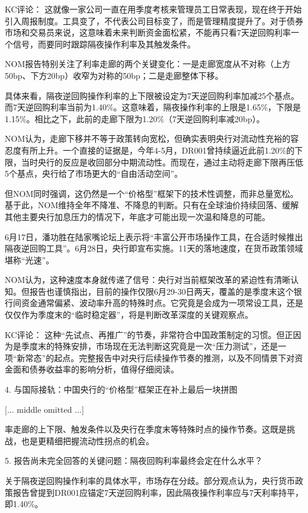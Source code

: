 \documentclass[11pt]{ctexart}
\begin{document}
KC评论： 这就像一家公司一直在用季度考核来管理员工日常表现，现在终于开始引入周报制度。工具变了，不代表公司目标变了，而是管理精度提升了。对于债券市场和交易员来说，这意味着未来判断资金面松紧，不能再只看7天逆回购利率一个信号，而要同时跟踪隔夜操作利率及其触发条件。

NOM报告特别关注了利率走廊的两个关键变化：一是走廊宽度从不对称（上方50bp、下方20bp）收窄为对称的50bp；二是走廊整体下移。

具体来看，隔夜逆回购操作利率的上下限被设定为7天逆回购利率加减25个基点。而7天逆回购利率当前为1.40\%。这意味着，隔夜操作利率的上限是1.65\%，下限是1.15\%。相比之下，此前的走廊下限为1.20\%（7天逆回购利率减20bp）。

NOM认为，走廊下移并不等于政策转向宽松，但确实表明央行对流动性充裕的容忍度有所上升。一个直接的证据是，今年4-5月，DR001曾持续逼近此前1.20\%的下限，当时央行的反应是收回部分中期流动性。而现在，通过主动将走廊下限再压低5个基点，央行给了市场更大的“自由活动空间”。

但NOM同时强调，这仍然是一个“价格型”框架下的技术性调整，而非总量宽松。基于此，NOM维持全年不降准、不降息的判断。只有在全球油价持续回落、缓解其他主要央行加息压力的情况下，年底才可能出现一次温和降息的可能。

6月17日，潘功胜在陆家嘴论坛上表示将“丰富公开市场操作工具，在合适时候推出隔夜逆回购工具”。6月28日，央行即宣布实施。11天的落地速度，在货币政策领域堪称“光速”。

NOM认为，这种速度本身就传递了信号：央行对当前框架改革的紧迫性有清晰认知。但报告也谨慎指出，目前的操作仅限6月29-30日两天，覆盖的是季度末这个银行间资金通常偏紧、波动率升高的特殊时点。它究竟是会成为一项常设工具，还是仅仅作为季度末的“临时稳定器”，将是判断改革深度的关键观察点。

KC评论： 这种“先试点、再推广”的节奏，非常符合中国政策制定的习惯。但正因为是季度末的特殊安排，市场现在无法判断这究竟是一次“压力测试”，还是一项“新常态”的起点。完整报告中对央行后续操作节奏的推测，以及不同情景下对资金面和债券收益率的影响分析，值得仔细阅读。

4. 与国际接轨：中国央行的“价格型”框架正在补上最后一块拼图



[... middle omitted ...]

率走廊的上下限、触发条件以及央行在季度末等特殊时点的操作节奏。这既是挑战，也是更精细把握流动性拐点的机会。

5. 报告尚未完全回答的关键问题：隔夜回购利率最终会定在什么水平？

关于隔夜逆回购操作利率的具体水平，市场存在分歧。部分观点认为，央行货币政策报告曾提到DR001应锚定7天逆回购利率，因此隔夜操作利率应与7天利率持平，即1.40\%。
\end{document}
